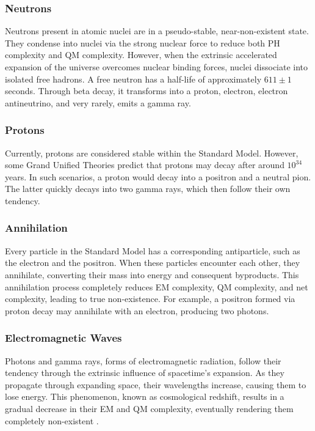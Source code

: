 \documentclass{article}
\begin{document}
\subsubsection{Neutrons}
Neutrons present in atomic nuclei are in a pseudo-stable, near-non-existent state. They condense into nuclei via the strong nuclear force to reduce both PH complexity and QM complexity. However, when the extrinsic accelerated expansion of the universe overcomes nuclear binding forces, nuclei dissociate into isolated free hadrons. A free neutron has a half-life of approximately $611 \pm 1$ seconds. Through beta decay, it transforms into a proton, electron, electron antineutrino, and very rarely, emits a gamma ray.

\subsubsection{Protons}
Currently, protons are considered stable within the Standard Model. However, some Grand Unified Theories predict that protons may decay after around $10^{34}$ years. In such scenarios, a proton would decay into a positron and a neutral pion. The latter quickly decays into two gamma rays, which then follow their own tendency.

\subsubsection{Annihilation}
Every particle in the Standard Model has a corresponding antiparticle, such as the electron and the positron. When these particles encounter each other, they annihilate, converting their mass into energy and consequent byproducts. This annihilation process completely reduces EM complexity, QM complexity, and net complexity, leading to true non-existence. For example, a positron formed via proton decay may annihilate with an electron, producing two photons.

\subsubsection{Electromagnetic Waves}
Photons and gamma rays, forms of electromagnetic radiation, follow their tendency through the extrinsic influence of spacetime’s expansion. As they propagate through expanding space, their wavelengths increase, causing them to lose energy. This phenomenon, known as cosmological redshift, results in a gradual decrease in their EM and QM complexity, eventually rendering them completely non-existent \cite{hubble1929}.
\end{document}
